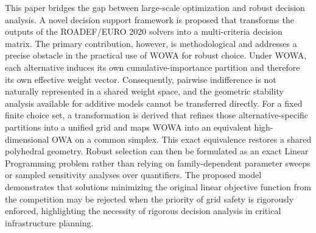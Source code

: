 This paper bridges the gap between large-scale optimization and robust decision analysis. A novel decision support framework is proposed that transforms the outputs of the ROADEF/EURO 2020 solvers into a multi-criteria decision matrix. The primary contribution, however, is methodological and addresses a precise obstacle in the practical use of WOWA for robust choice. Under WOWA, each alternative induces its own cumulative-importance partition and therefore its own effective weight vector. Consequently, pairwise indifference is not naturally represented in a shared weight space, and the geometric stability analysis available for additive models cannot be transferred directly. For a fixed finite choice set, a transformation is derived that refines those alternative-specific partitions into a unified grid and maps WOWA into an equivalent high-dimensional OWA on a common simplex. This exact equivalence restores a shared polyhedral geometry. Robust selection can then be formulated as an exact Linear Programming problem rather than relying on family-dependent parameter sweeps or sampled sensitivity analyses over quantifiers. The proposed model demonstrates that solutions minimizing the original linear objective function from the competition may be rejected when the priority of grid safety is rigorously enforced, highlighting the necessity of rigorous decision analysis in critical infrastructure planning.
